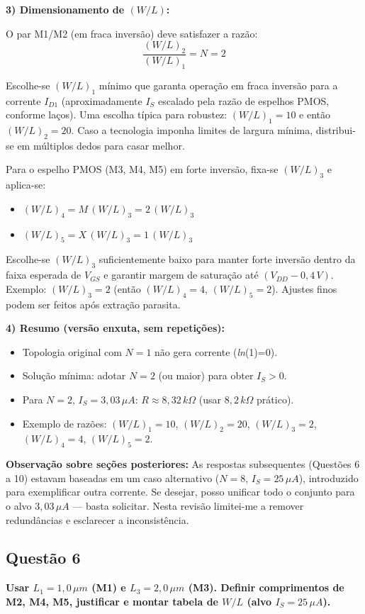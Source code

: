 ﻿\documentclass[12pt,a4paper]{article}
\begin{document}
	\textbf{3) Dimensionamento de $(W/L)$:}

O par M1/M2 (em fraca inversão) deve satisfazer a razão:
$$ \frac{(W/L)_2}{(W/L)_1} = N = 2 $$

Escolhe-se $(W/L)_1$ mínimo que garanta operação em fraca inversão para a corrente $I_{D1}$ (aproximadamente $I_S$ escalado pela razão de espelhos PMOS, conforme laços). Uma escolha típica para robustez: $(W/L)_1 = 10$ e então $(W/L)_2 = 20$. Caso a tecnologia imponha limites de largura mínima, distribui-se em múltiplos dedos para casar melhor.

Para o espelho PMOS (M3, M4, M5) em forte inversão, fixa-se $(W/L)_3$ e aplica-se:
\begin{itemize}
    \item $(W/L)_4 = M\,(W/L)_3 = 2\,(W/L)_3$
    \item $(W/L)_5 = X\,(W/L)_3 = 1\,(W/L)_3$
\end{itemize}

Escolhe-se $(W/L)_3$ suficientemente baixo para manter forte inversão dentro da faixa esperada de $V_{GS}$ e garantir margem de saturação até $(V_{DD} - 0{,}4\,V)$. Exemplo: $(W/L)_3 = 2$ (então $(W/L)_4 = 4$, $(W/L)_5 = 2$). Ajustes finos podem ser feitos após extração parasita.

	\textbf{4) Resumo (versão enxuta, sem repetições):}
\begin{itemize}
    \item Topologia original com $N=1$ não gera corrente (\textit{ln}(1)=0).
    \item Solução mínima: adotar $N=2$ (ou maior) para obter $I_S>0$.
    \item Para $N=2$, $I_S=3{,}03\,\mu A$: $R \approx 8{,}32\,k\Omega$ (usar $8{,}2\,k\Omega$ prático).
    \item Exemplo de razões: $(W/L)_1=10$, $(W/L)_2=20$, $(W/L)_3=2$, $(W/L)_4=4$, $(W/L)_5=2$.
\end{itemize}

	\textbf{Observação sobre seções posteriores:} As respostas subsequentes (Questões 6 a 10) estavam baseadas em um caso alternativo ($N=8$, $I_S=25\,\mu A$), introduzido para exemplificar outra corrente. Se desejar, posso unificar todo o conjunto para o alvo $3{,}03\,\mu A$ — basta solicitar. Nesta revisão limitei-me a remover redundâncias e esclarecer a inconsistência.

\subsection*{Questão 6}
\textbf{Usar $L_1 = 1,0\,\mu m$ (M1) e $L_3 = 2,0\,\mu m$ (M3). Definir comprimentos de M2, M4, M5, justificar e montar tabela de $W/L$ (alvo $I_S=25\,\mu A$).}
\end{document}
